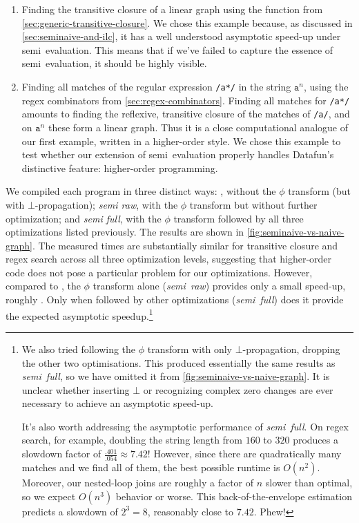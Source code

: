 \begin{enumerate}
\item Finding the transitive closure of a linear graph using the 
  function from \cref{sec:generic-transitive-closure}. We chose this example
  because, as discussed in \cref{sec:seminaive-and-ilc}, it has a well
  understood asymptotic speed-up under semi\naive\ evaluation. This means that
  if we've failed to capture the essence of semi\naive\ evaluation, it should be
  highly visible.

\item Finding all matches of the regular expression \texttt{/a*/} in the string
  $\texttt{a}^n$, using the regex combinators from \cref{sec:regex-combinators}.
  Finding all matches for \texttt{/a*/} amounts to finding the reflexive,
  transitive closure of the matches of \texttt{/a/}, and on $\texttt{a}^n$ these
  form a linear graph. Thus it is a close computational analogue of our first
  example, written in a higher-order style. We chose this example to test
  whether our extension of semi\naive\ evaluation properly handles Datafun's
  distinctive feature: higher-order programming.
\end{enumerate}

We compiled each program in three distinct ways: \emph{\naive{}}, without the
$\phi$ transform (but with $\bot$-propagation); \emph{semi\naive{} raw}, with
the $\phi$ transform but without further optimization; and \emph{semi\naive{}
  full}, with the $\phi$ transform followed by all three optimizations listed
previously. The results are shown in \cref{fig:seminaive-vs-naive-graph}.
%
The measured times are substantially similar for transitive closure and regex
search across all three optimization levels, suggesting that higher-order code
does not pose a particular problem for our optimizations. However, compared to
\emph{\naive}, the $\phi$ transform alone (\emph{semi\naive\ raw}) provides only
a small speed-up, roughly . Only when followed by other
optimizations (\emph{semi\naive\ full}) does it provide the expected asymptotic
speedup.\footnote{We also tried following the $\phi$ transform with only
  $\bot$-propagation, dropping the other two optimisations. This produced
  essentially the same results as \emph{semi\naive\ full}, so we have omitted it
  from \cref{fig:seminaive-vs-naive-graph}. It is unclear whether inserting
  $\bot$ or recognizing complex zero changes are ever necessary to achieve an
  asymptotic speed-up.

  It's also worth addressing the asymptotic performance of
  \emph{semi\naive\ full}. On regex search, for example, doubling the string
  length from $160$ to $320$ produces a slowdown factor of $\frac{.401}{.054}
  \approx 7.42$! However, since there are quadratically many matches and we find
  all of them, the best possible runtime is $O(n^2)$. Moreover, our nested-loop
  joins are roughly a factor of $n$ slower than optimal, so we expect $O(n^3)$
  behavior or worse. This back-of-the-envelope estimation predicts a slowdown of
  $2^3 = 8$, reasonably close to $7.42$. Phew!}

